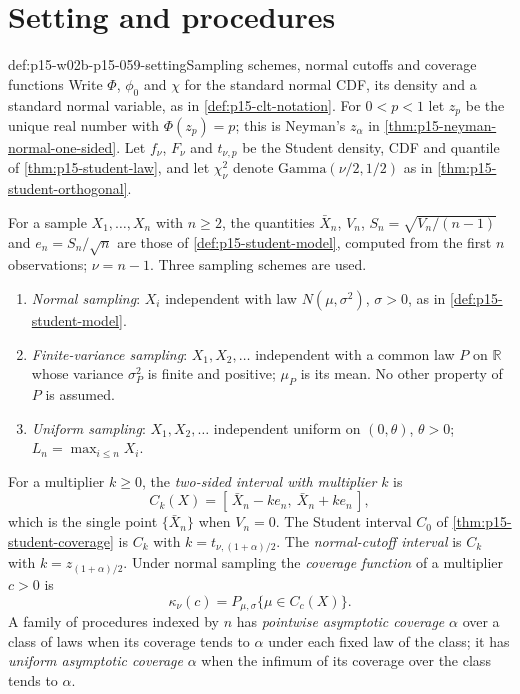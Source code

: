 \section{Setting and procedures}
\label{sec:p15-w02b-p15-059-setting}

\begin{hbdefinition}{def:p15-w02b-p15-059-setting}{Sampling schemes, normal cutoffs and coverage functions}
Write \(\Phi\), \(\phi_0\) and \(\chi\) for the standard normal CDF, its
density and a standard normal variable, as in
\cref{def:p15-clt-notation}. For \(0<p<1\) let \(z_p\) be the unique real
number with \(\Phi(z_p)=p\); this is Neyman's \(z_\alpha\) in
\cref{thm:p15-neyman-normal-one-sided}. Let \(f_\nu\), \(F_\nu\) and
\(t_{\nu,p}\) be the Student density, CDF and quantile of
\cref{thm:p15-student-law}, and let \(\chi^2_\nu\) denote
\(\mathrm{Gamma}(\nu/2,1/2)\) as in \cref{thm:p15-student-orthogonal}.

For a sample \(X_1,\ldots,X_n\) with \(n\geq2\), the quantities
\(\bar X_n\), \(V_n\), \(S_n=\sqrt{V_n/(n-1)}\) and
\(e_n=S_n/\sqrt n\) are those of \cref{def:p15-student-model}, computed
from the first \(n\) observations; \(\nu=n-1\). Three sampling schemes are
used.
\begin{enumerate}
\item \emph{Normal sampling}: \(X_i\) independent with law
\(N(\mu,\sigma^2)\), \(\sigma>0\), as in \cref{def:p15-student-model}.
\item \emph{Finite-variance sampling}: \(X_1,X_2,\ldots\) independent with
a common law \(P\) on \(\mathbb R\) whose variance \(\sigma_P^2\) is finite
and positive; \(\mu_P\) is its mean. No other property of \(P\) is assumed.
\item \emph{Uniform sampling}: \(X_1,X_2,\ldots\) independent uniform on
\((0,\theta)\), \(\theta>0\); \(L_n=\max_{i\leq n}X_i\).
\end{enumerate}
For a multiplier \(k\geq0\), the \emph{two-sided interval with multiplier}
\(k\) is
\[
 C_k(X)=[\,\bar X_n-ke_n,\ \bar X_n+ke_n\,],
\]
which is the single point \(\{\bar X_n\}\) when \(V_n=0\). The Student
interval \(C_0\) of \cref{thm:p15-student-coverage} is \(C_k\) with
\(k=t_{\nu,(1+\alpha)/2}\). The \emph{normal-cutoff interval} is \(C_k\)
with \(k=z_{(1+\alpha)/2}\). Under normal sampling the \emph{coverage
function} of a multiplier \(c>0\) is
\[
 \kappa_\nu(c)=P_{\mu,\sigma}\{\mu\in C_c(X)\}.
\]
A family of procedures indexed by \(n\) has \emph{pointwise asymptotic
coverage} \(\alpha\) over a class of laws when its coverage tends to
\(\alpha\) under each fixed law of the class; it has \emph{uniform
asymptotic coverage} \(\alpha\) when the infimum of its coverage over the
class tends to \(\alpha\).
\end{hbdefinition}

